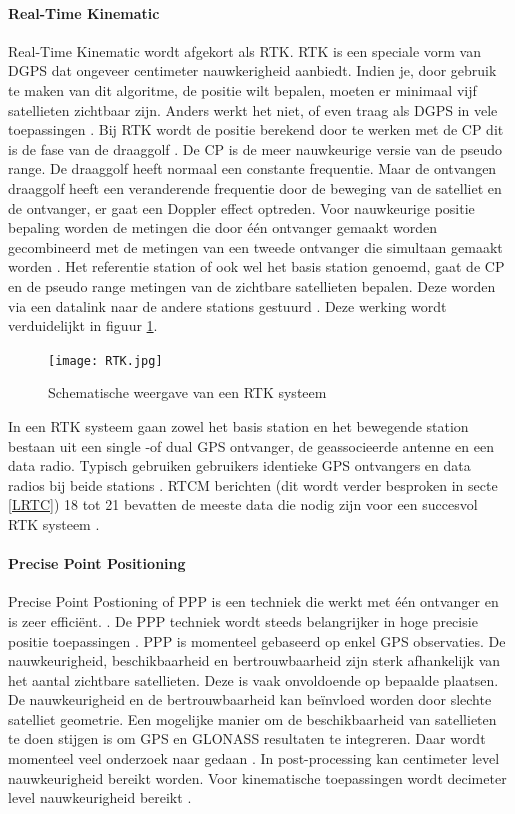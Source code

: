 \paragraph{Real-Time Kinematic}
Real-Time Kinematic wordt afgekort als RTK. RTK is een speciale vorm van DGPS dat ongeveer centimeter nauwkerigheid aanbiedt. Indien je, door gebruik te maken van dit algoritme, de positie wilt bepalen, moeten er minimaal vijf satellieten zichtbaar zijn. Anders werkt het niet, of even traag als DGPS in vele toepassingen \cite{LBibRTK}. Bij RTK wordt de positie berekend door te werken met de CP dit is de fase van de draaggolf \cite{LBibRTK2}. De CP is de meer nauwkeurige versie van de pseudo range. De draaggolf heeft normaal een constante frequentie. Maar de ontvangen draaggolf heeft een veranderende frequentie door de beweging van de satelliet en de ontvanger, er gaat een Doppler effect optreden. Voor nauwkeurige positie bepaling worden de metingen die door \'e\'en ontvanger gemaakt worden gecombineerd met de metingen van een tweede ontvanger die simultaan gemaakt worden \cite{LBibRTK3}. Het referentie station of ook wel het basis station genoemd, gaat de CP en de pseudo range metingen van de zichtbare satellieten bepalen. Deze worden via een datalink naar de andere stations gestuurd \cite{LBibDGPS}. Deze werking wordt verduidelijkt in figuur \ref{imgRTK}. 

\begin{figure}[hpb]
	\texttt{[image: RTK.jpg]}
	\caption{Schematische weergave van een RTK systeem \cite{LBibDGPS}}
	\label{imgRTK}
\end{figure}

In een RTK systeem gaan zowel het basis station en het bewegende station bestaan uit een single -of dual GPS ontvanger, de geassocieerde antenne en een data radio. Typisch gebruiken gebruikers identieke GPS ontvangers en data radios bij beide stations \cite{LBibRTK3}. RTCM berichten (dit wordt verder besproken in secte \ref{LRTC}) 18 tot 21 bevatten de meeste data die nodig zijn voor een succesvol RTK systeem \cite{LBibDGPS} .


\paragraph{Precise Point Positioning}
Precise Point Postioning of PPP is een techniek die werkt met \'e\'en ontvanger en is zeer effici\"ent. \cite{LBibGNSS4}. De PPP techniek wordt steeds belangrijker in hoge precisie positie toepassingen \cite{LBibPPP2}. PPP is momenteel gebaseerd op enkel GPS observaties. De nauwkeurigheid, beschikbaarheid en bertrouwbaarheid zijn sterk afhankelijk van het aantal zichtbare satellieten. Deze is vaak onvoldoende op bepaalde plaatsen. De nauwkeurigheid en de bertrouwbaarheid kan be\"invloed worden door slechte satelliet geometrie. Een mogelijke manier om de beschikbaarheid van satellieten te doen stijgen is om GPS en GLONASS resultaten te integreren. Daar wordt momenteel veel onderzoek naar gedaan \cite{LBibPPP}. In post-processing kan centimeter level nauwkeurigheid bereikt worden. Voor kinematische toepassingen wordt decimeter level nauwkeurigheid bereikt \cite{LBibGPS2}.  

